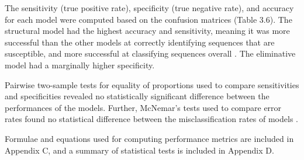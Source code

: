

The sensitivity (true positive rate), specificity (true negative rate), and accuracy for each model were computed based on the confusion matrices (Table 3.6). The structural model had the highest accuracy and sensitivity, meaning it was more successful than the other models at correctly identifying sequences that are susceptible, and more successful at classifying sequences overall \cite{Vu2015}. The eliminative model had a marginally higher specificity.



Pairwise two-sample tests for equality of proportions used to compare sensitivities and specificities revealed no statistically significant difference between the performances of the models. Further, McNemar's tests used to compare error rates found no statistical difference between the misclassification rates of models \cite{Vu2015, PatrickWalters2021, Crawley2015}.

Formulae and equations used for computing performance metrics are included in Appendix C, and a summary of statistical tests is included in Appendix D.  
